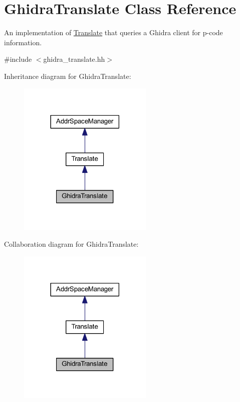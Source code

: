 \hypertarget{class_ghidra_translate}{}\section{Ghidra\+Translate Class Reference}
\label{class_ghidra_translate}


An implementation of \mbox{\hyperlink{class_translate}{Translate}} that queries a Ghidra client for p-\/code information.  




{\ttfamily \#include $<$ghidra\+\_\+translate.\+hh$>$}



Inheritance diagram for Ghidra\+Translate\+:
\nopagebreak
\begin{figure}[H]
\begin{center}
\leavevmode
\includegraphics[width=182pt]{class_ghidra_translate__inherit__graph}
\end{center}
\end{figure}


Collaboration diagram for Ghidra\+Translate\+:
\nopagebreak
\begin{figure}[H]
\begin{center}
\leavevmode
\includegraphics[width=182pt]{class_ghidra_translate__coll__graph}
\end{center}
\end{figure}
